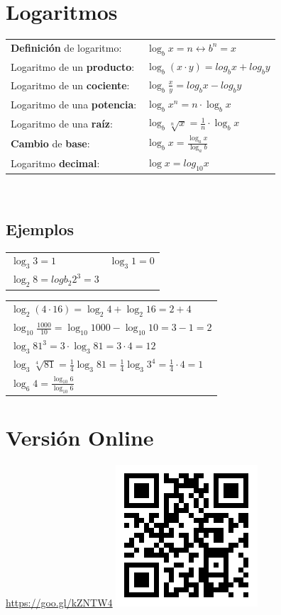 \documentclass[a4paper,spanish,9pt]{extarticle}
\begin{document}
\begin{multicols*}{2}
\section{Logaritmos}

\begin{tabular}{ll}
\textbf{Definición} de logaritmo: & $\log_b x = n \longleftrightarrow b^n=x$\\
Logaritmo de un \textbf{producto}: & $\log_b \left(x\cdot y\right)=log_b x + log_b y$\\
Logaritmo de un \textbf{cociente}: & $\log_b \frac{x}{y}=log_b x - log_b y$\\
Logaritmo de una \textbf{potencia}: & $\log_b {x^n} = n \cdot \log_b x$\\
Logaritmo de una \textbf{raíz}: & $\log_b {\sqrt[n]{x}} = \frac{1}{n} \cdot \log_b x$\\
\textbf{Cambio} de \textbf{base}: & $\log_b x =\frac{\log_a x}{\log_a b}$\\
Logaritmo \textbf{decimal}: & $\log x = log_{10} x$
\end{tabular}\\

\subsection{Ejemplos}

\begin{tabular}{ll}
$\log_3 3 = 1$ & $\log_3 1 = 0$ \\
$\log_2 8 = logb_2 2^3 = 3$  
\end{tabular}

\begin{tabular}{l}
$\log_2 \left(4\cdot 16\right)=\log_2 4 + \log_2 16=2 + 4$  \\
$\log_{10}\frac{1000}{10} =\log_{10} 1000 - \log_{10} 10 = 3-1=2 $ \\
$\log_3 {81^3} = 3 \cdot \log_3 81= 3 \cdot 4= 12$ \\
$\log_3 {\sqrt[4]{81}} = \frac{1}{4} \log_3 81=\frac{1}{4} \log_3 3^4= \frac{1}{4} \cdot 4= 1$ \\
$\log_6 4 =\frac{\log_{10} 6}{\log_{10} 6}$
\end{tabular}



\section{Versión Online}

\url{https://goo.gl/kZNTW4} \includegraphics[width=0.15\columnwidth]{qr_chuletapot}





\end{multicols*}
\end{document}
